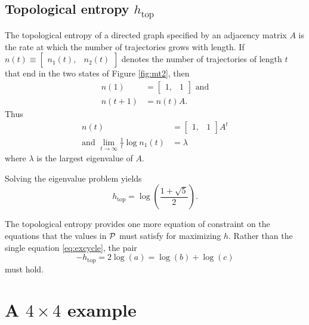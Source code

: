 \documentclass[12pt]{article} \usepackage{amsmath,amsfonts}
\newcommand{\htop}{{h_{\text{top}}}}
\newcommand{\T}{{\cal P}}
\begin{document}
\subsection{Topological entropy $\htop$}
\label{sec:htop}

The topological entropy of a directed graph specified by an adjacency
matrix $A$ is the rate at which the number of trajectories grows with
length.  If $n(t)\equiv\begin{bmatrix} n_1(t),&n_2(t)\end{bmatrix}$
denotes the number of trajectories of length $t$ that end in the two
states of Figure \ref{fig:mt2}, then
\begin{align*}
  n(1) &= \begin{bmatrix} 1,&1\end{bmatrix} \text{ and} \\
  n(t+1) &= n(t) A.
\end{align*}
Thus
\begin{align*}
  n(t) &= \begin{bmatrix} 1,&1\end{bmatrix} A^t \\
  \text{and }\lim_{t\rightarrow \infty} \frac{1}{t} \log n_1(t) &=
  \lambda
\end{align*}
where $\lambda$ is the largest eigenvalue of $A$.

Solving the eigenvalue problem yields
\begin{equation*}
  \htop = \log\left(\frac{1+\sqrt{5}}{2}\right).
\end{equation*}

The topological entropy provides one more equation of constraint on
the equations that the values in $\T$ must satisfy for maximizing $h$.
Rather than the single equation \eqref{eq:excycle}, the pair
\begin{equation*}
  - \htop = 2\log(a) = \log(b) + \log(c)
\end{equation*}
must hold.

\section{A $4\times 4$ example}
\label{sec:fourbyfour}
\end{document}
